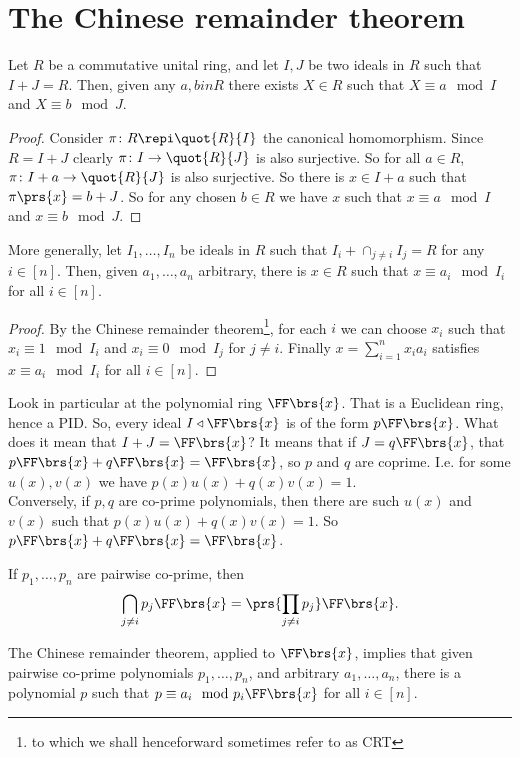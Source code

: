 \documentclass[10pt,a4paper,twoside,openany,hidelinks]{book}
\begin{document}
\section{The Chinese remainder theorem}
\begin{theorem}
Let $R$ be a commutative unital ring, and let $I,J$ be two ideals in $R$ such that $I+J = R$. Then, given any $a,b in R$ there exists $X \in R$ such that $X \equiv a\mod{I}$ and $X \equiv b\mod{J}$.
\end{theorem}
\begin{proof}
Consider $\pi \colon R \repi \quot{R}{I}$ the canonical homomorphism.
Since $R = I+J$ clearly $\pi \colon I \to \quot{R}{J}$ is also surjective. So for all $a \in R$, $\pi \colon I+a \to \quot{R}{J}$ is also surjective. So there is $x \in I+a$ such that $\pi\prs{x} = b+J$. So for any chosen $b \in R$ we have $x$ such that $x \equiv a\mod{I}$ and $x \equiv b \mod{J}$.
\end{proof}
\begin{theorem}
More generally, let $I_1, \ldots, I_n$ be ideals in $R$ such that $I_i + \cap_{j \neq i} I_j = R$ for any $i \in [n]$. Then, given $a_1, \ldots, a_n$ arbitrary, there is $x \in R$ such that $x \equiv a_i \mod{I_i}$ for all $i \in [n]$.
\end{theorem}
\begin{proof}
By the Chinese remainder theorem\footnote{to which we shall henceforward sometimes refer to as CRT}, for each $i$ we can choose $x_i$ such that $x_i \equiv 1 \mod{I_i}$ and $x_i \equiv 0 \mod{I_j}$ for $j \neq i$.
Finally $x = \sum_{i=1}^n x_i a_i$ satisfies $x \equiv a_i \mod{I_i}$ for all $i \in [n]$.
\end{proof}
\begin{example}
Look in particular at the polynomial ring $\FF\brs{x}$. That is a Euclidean ring, hence a PID. So, every ideal $I \triangleleft \FF\brs{x}$ is of the form $p \FF\brs{x}$. What does it mean that $I+J = \FF\brs{x}$? It means that if $J = q\FF\brs{x}$, that $p\FF\brs{x} + q\FF\brs{x} = \FF\brs{x}$, so $p$ and $q$ are coprime. I.e. for some $u(x),v(x)$ we have $p(x)u(x) + q(x)v(x) = 1$. \\
Conversely, if $p,q$ are co-prime polynomials, then there are such $u(x)$ and $v(x)$ such that $p(x)u(x) + q(x)v(x) = 1$. So $p\FF\brs{x} + q\FF\brs{x} = \FF\brs{x}$.
\end{example}
\begin{remark}
If $p_1, \ldots, p_n$ are pairwise co-prime, then
\[\bigcap_{j\neq i} p_j \FF\brs{x} = \prs{\prod_{j\neq i}p_j}\FF\brs{x}\text{.}\]
\end{remark}
\begin{conclusion}
The Chinese remainder theorem, applied to $\FF\brs{x}$, implies that given pairwise co-prime polynomials $p_1, \ldots, p_n$, and arbitrary $a_1, \ldots, a_n$, there is a polynomial $p$ such that $p \equiv a_i \mod{p_i \FF\brs{x}}$ for all $i \in [n]$.
\end{conclusion}
\end{document}
